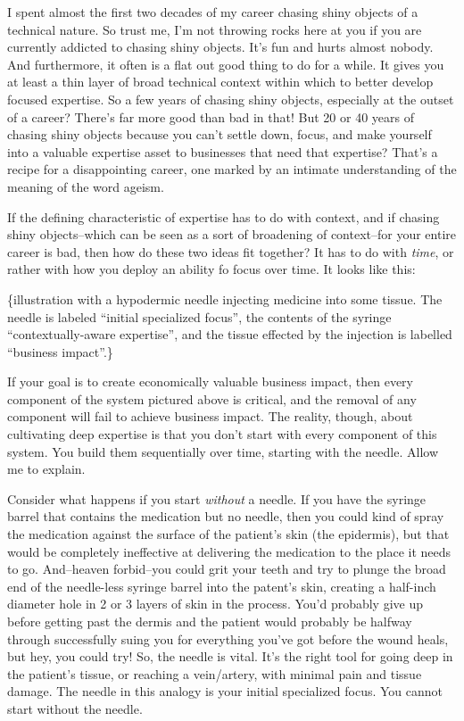 I spent almost the first two decades of my career chasing shiny objects of a technical nature. So trust me, I'm not throwing rocks here at you if you are currently addicted to chasing shiny objects. It's fun and hurts almost nobody. And furthermore, it often is a flat out good thing to do for a while. It gives you at least a thin layer of broad technical context within which to better develop focused expertise. So a few years of chasing shiny objects, especially at the outset of a career? There's far more good than bad in that! But 20 or 40 years of chasing shiny objects because you can't settle down, focus, and make yourself into a valuable expertise asset to businesses that need that expertise? That's a recipe for a disappointing career, one marked by an intimate understanding of the meaning of the word ageism.

If the defining characteristic of expertise has to do with context, and if chasing shiny objects--which can be seen as a sort of broadening of context--for your entire career is bad, then how do these two ideas fit together? It has to do with \emph{time}, or rather with how you deploy an ability fo focus over time. It looks like this:

\{illustration with a hypodermic needle injecting medicine into some tissue. The needle is labeled ``initial specialized focus'', the contents of the syringe ``contextually-aware expertise'', and the tissue effected by the injection is labelled ``business impact''.\}

If your goal is to create economically valuable business impact, then every component of the system pictured above is critical, and the removal of any component will fail to achieve business impact. The reality, though, about cultivating deep expertise is that you don't start with every component of this system. You build them sequentially over time, starting with the needle. Allow me to explain.

Consider what happens if you start \emph{without} a needle. If you have the syringe barrel that contains the medication but no needle, then you could kind of spray the medication against the surface of the patient's skin (the epidermis), but that would be completely ineffective at delivering the medication to the place it needs to go. And--heaven forbid--you could grit your teeth and try to plunge the broad end of the needle-less syringe barrel into the patent's skin, creating a half-inch diameter hole in 2 or 3 layers of skin in the process. You'd probably give up before getting past the dermis and the patient would probably be halfway through successfully suing you for everything you've got before the wound heals, but hey, you could try! So, the needle is vital. It's the right tool for going deep in the patient's tissue, or reaching a vein/artery, with minimal pain and tissue damage. The needle in this analogy is your initial specialized focus. You cannot start without the needle.

